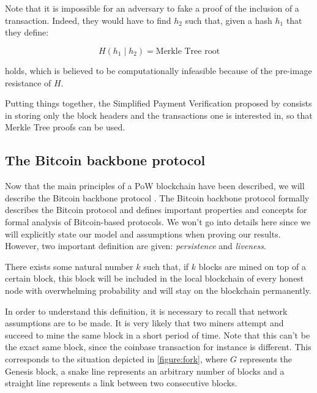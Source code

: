 \documentclass[11pt]{report}
\begin{document}
                Note that it is impossible for an adversary to fake a proof of the inclusion of a transaction. Indeed, they would have to find \(h_2\) such that, given a hash \(h_1\) that they define:
                
                \[H\left(h_1\middle|h_2\right)=\text{Merkle Tree root}\]
                
                holds, which is believed to be computationally infeasible because of the pre-image resistance of \(H\).
                
                Putting things together, the Simplified Payment Verification proposed by \citeauthor{Bitcoin} consists in storing only the block headers and the transactions one is interested in, so that Merkle Tree proofs can be used.

            \subsection{The Bitcoin backbone protocol}
                \label{subsec:backbone}
                Now that the main principles of a PoW blockchain have been described, we will describe the Bitcoin backbone protocol \cite{Backbone}. The Bitcoin backbone protocol formally describes the Bitcoin protocol and defines important properties and concepts for formal analysis of Bitcoin-based protocols. We won't go into details here since we will explicitly state our model and assumptions when proving our results. However, two important definition are given: \textit{persistence} and \textit{liveness}.
                
                \begin{Definition}
                    There exists some natural number \(k\) such that, if \(k\) blocks are mined on top of a certain block, this block will be included in the local blockchain of every honest node with overwhelming probability and will stay on the blockchain permanently.
                \end{Definition}
                
                In order to understand this definition, it is necessary to recall that network assumptions are to be made. It is very likely that two miners attempt and succeed to mine the same block in a short period of time. Note that this can't be the exact same block, since the coinbase transaction for instance is different. This corresponds to the situation depicted in \autoref{figure:fork}, where \(G\) represents the Genesis block, a snake line represents an arbitrary number of blocks and a straight line represents a link between two consecutive blocks. 
                
\end{document}
